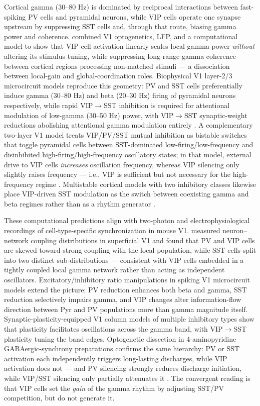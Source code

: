 \documentclass[11pt]{article}
\let\origrightarrow\rightarrow
\def\rightarrow{\ensuremath{\origrightarrow}}
\begin{document}
Cortical gamma (30--80 Hz) is dominated by reciprocal interactions between fast-spiking PV cells and pyramidal neurons, while VIP cells operate one synapse upstream by suppressing SST cells and, through that route, biasing gamma power and coherence. \citet{Veit2023} combined V1 optogenetics, LFP, and a computational model to show that VIP-cell activation linearly scales local gamma power \textit{without} altering its stimulus tuning, while suppressing long-range gamma coherence between cortical regions processing non-matched stimuli --- a dissociation between local-gain and global-coordination roles. Biophysical V1 layer-2/3 microcircuit models reproduce this geometry: PV and SST cells preferentially induce gamma (30--80 Hz) and beta (20--30 Hz) firing of pyramidal neurons respectively, while rapid VIP\rightarrow SST inhibition is required for attentional modulation of low-gamma (30--50 Hz) power, with VIP\rightarrow SST synaptic-weight reductions abolishing attentional gamma modulation entirely \citep{Wagatsuma2023}. A complementary two-layer V1 model treats VIP/PV/SST mutual inhibition as bistable switches that toggle pyramidal cells between SST-dominated low-firing/low-frequency and disinhibited high-firing/high-frequency oscillatory states; in that model, external drive to VIP cells \textit{increases} oscillation frequency, whereas VIP silencing only slightly raises frequency --- i.e., VIP is sufficient but not necessary for the high-frequency regime \citep{Hahn2022}. Multistable cortical models with two inhibitory classes likewise place VIP-driven SST modulation as the switch between coexisting gamma and beta regimes rather than as a rhythm generator \citep{Sarkar2025}.

These computational predictions align with two-photon and electrophysiological recordings of cell-type-specific synchronization in mouse V1. \citet{Knoblich2019} measured neuron--network coupling distributions in superficial V1 and found that PV and VIP cells are skewed toward strong coupling with the local population, while SST cells split into two distinct sub-distributions --- consistent with VIP cells embedded in a tightly coupled local gamma network rather than acting as independent oscillators. Excitatory/inhibitory ratio manipulations in spiking V1 microcircuit models extend the picture: PV reduction enhances both beta and gamma, SST reduction selectively impairs gamma, and VIP changes alter information-flow direction between Pyr and PV populations more than gamma magnitude itself. Synaptic-plasticity-equipped V1 column models of multiple inhibitory types show that plasticity facilitates oscillations across the gamma band, with VIP\rightarrow SST plasticity tuning the band edges. Optogenetic dissection in 4-aminopyridine GABAergic-synchrony preparations confirms the same hierarchy: PV or SST activation each independently triggers long-lasting discharges, while VIP activation does not --- and PV silencing strongly reduces discharge initiation, while VIP/SST silencing only partially attenuates it \citep{Bohannon2018}. The convergent reading is that VIP cells set the \textit{gain} of the gamma rhythm by adjusting SST/PV competition, but do not generate it.
\end{document}
